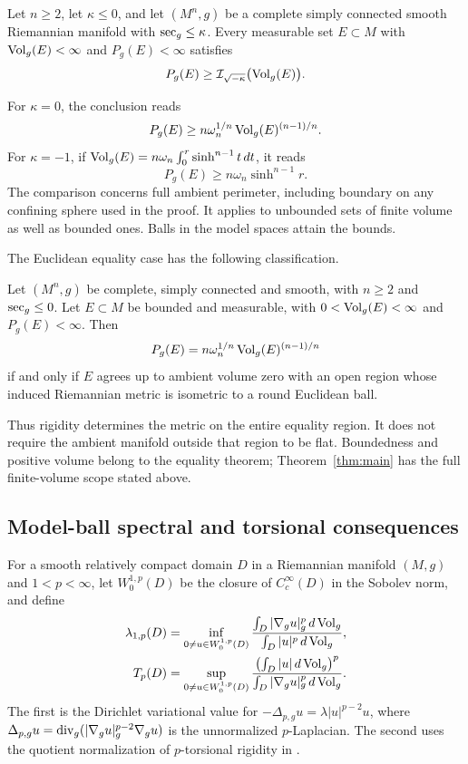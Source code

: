 \begin{theorem}\label{thm:main}
Let $n\ge2$, let $\kappa\le0$, and let $(M^n,g)$ be a complete simply
connected smooth Riemannian manifold with $\operatorname{sec}_g\le\kappa$.
Every measurable set $E\subset M$ with $\operatorname{Vol}_g(E)<\infty$ and
$P_g(E)<\infty$ satisfies
\[
 P_g(E)\ge \mathcal I_{\sqrt{-\kappa}}\bigl(\operatorname{Vol}_g(E)\bigr).
\]
\end{theorem}

For $\kappa=0$, the conclusion reads
\[
 P_g(E)
 \ge n\omega_n^{1/n}\operatorname{Vol}_g(E)^{(n-1)/n}.
\]
For $\kappa=-1$, if
$\operatorname{Vol}_g(E)=n\omega_n\int_0^r\sinh^{n-1}t\,dt$, it reads
\[
 P_g(E)\ge n\omega_n\sinh^{n-1}r.
\]
The comparison concerns full ambient perimeter, including boundary on
any confining sphere used in the proof. It applies to unbounded sets
of finite volume as well as bounded ones. Balls in the model spaces
attain the bounds.

The Euclidean equality case has the following classification.

\begin{theorem}\label{thm:equality}
Let $(M^n,g)$ be complete, simply connected and smooth, with
$n\ge2$ and $\operatorname{sec}_g\le0$. Let $E\subset M$ be bounded and measurable,
with $0<\operatorname{Vol}_g(E)<\infty$ and $P_g(E)<\infty$. Then
\[
 P_g(E)=n\omega_n^{1/n}\operatorname{Vol}_g(E)^{(n-1)/n}
\]
if and only if $E$ agrees up to ambient volume zero with an open region
whose induced Riemannian metric is isometric to a round Euclidean ball.
\end{theorem}

Thus rigidity determines the metric on the entire equality region.
It does not require the ambient manifold outside that region to be
flat. Boundedness and positive volume belong to the equality theorem;
Theorem~\ref{thm:main} has the full finite-volume scope stated above.

\subsection{Model-ball spectral and torsional consequences}

For a smooth relatively compact domain $D$ in a Riemannian manifold
$(M,g)$ and $1<p<\infty$, let
$W^{1,p}_0(D)$ be the closure of $C_c^\infty(D)$ in the Sobolev norm, and
define
\[
 \begin{aligned}
 \lambda_{1,p}(D)&=\inf_{0\ne u\in W^{1,p}_0(D)}
 \frac{\int_D|\nabla_g u|_g^p\,d\operatorname{Vol}_g}{\int_D|u|^p\,d\operatorname{Vol}_g},\\
 T_p(D)&=\sup_{0\ne u\in W^{1,p}_0(D)}
 \frac{\bigl(\int_D|u|\,d\operatorname{Vol}_g\bigr)^p}
      {\int_D|\nabla_g u|_g^p\,d\operatorname{Vol}_g}.
 \end{aligned}
\]
The first is the Dirichlet variational value for
$-\Delta_{p,g}u=\lambda|u|^{p-2}u$, where\newline
$\Delta_{p,g}u=\operatorname{div}_g(|\nabla_g u|_g^{p-2}\nabla_g u)$ is the
unnormalized $p$-Laplacian. The second uses the quotient normalization
of $p$-torsional rigidity in \cite[(1.1)--(1.6)]{BrianiButtazzoPrinari2022}.

